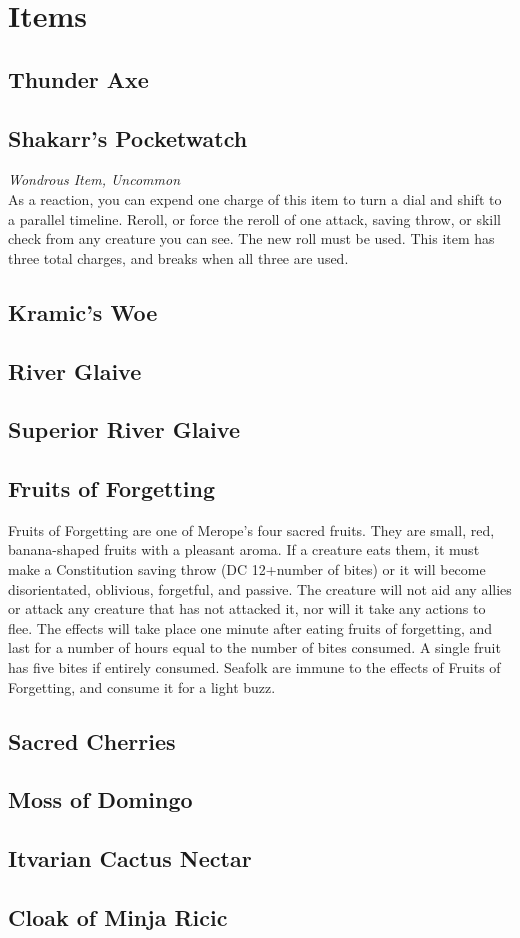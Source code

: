 \chapter{Items}\label{Items}
\section{Thunder Axe}
\section{Shakarr's Pocketwatch}
\textit{Wondrous Item, Uncommon}\\
As a reaction, you can expend one charge of this item to turn a dial and shift to a parallel timeline. Reroll, or force the reroll of one attack, saving throw, or skill check from any creature you can see. The new roll must be used. This item has three total charges, and breaks when all three are used.
\section{Kramic's Woe}
\section{River Glaive}
\section{Superior River Glaive}
\section{Fruits of Forgetting}
Fruits of Forgetting are one of Merope's four sacred fruits. They are small, red, banana-shaped fruits with a pleasant aroma. If a creature eats them, it must make a Constitution saving throw (DC 12+number of bites) or it will become disorientated, oblivious, forgetful, and passive. The creature will not aid any allies or attack any creature that has not attacked it, nor will it take any actions to flee. The effects will take place one minute after eating fruits of forgetting, and last for a number of hours equal to the number of bites consumed. A single fruit has five bites if entirely consumed. Seafolk are immune to the effects of Fruits of Forgetting, and consume it for a light buzz.

\section{Sacred Cherries}
\section{Moss of Domingo}
\section{Itvarian Cactus Nectar}
\section{Cloak of Minja Ricic}
